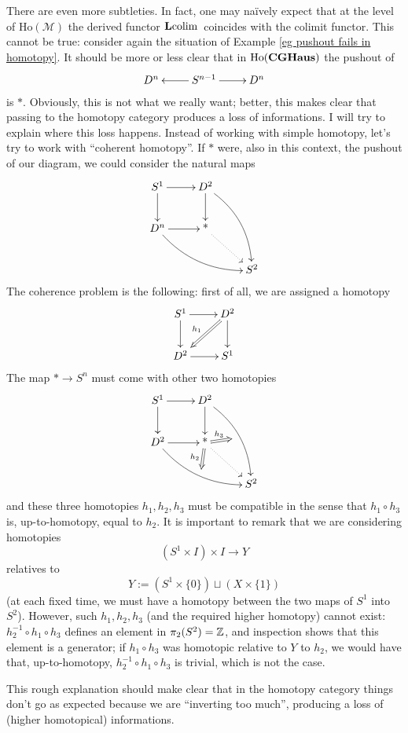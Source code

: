\begin{rmk}
There are even more subtleties. In fact, one may na\"ively expect that at the level of $\mathrm{Ho}(\mathcal M)$ the derived functor $\mathbf L \mathrm{colim} \,$ coincides with the colimit functor. This cannot be true: consider again the situation of Example \ref{eg pushout fails in homotopy}. It should be more or less clear that in $\mathrm{Ho}(\mathbf{CGHaus})$ the pushout of
\[
\xymatrix{
D^n & S^{n-1} \ar[l] \ar[r] & D^n
}
\]
is $*$. Obviously, this is not what we really want; better, this makes clear that passing to the homotopy category produces a loss of informations. I will try to explain where this loss happens. Instead of working with simple homotopy, let's try to work with ``coherent homotopy''. If $*$ were, also in this context, the pushout of our diagram, we could consider the natural maps
\[
\xymatrix{
S^1 \ar[d] \ar[r] & D^2 \ar@/^1pc/[ddr] \ar[d] \\ D^n \ar[r] \ar@/_1pc/[drr] & \text{*} \ar@{.>}[dr] \\ & & S^2
}
\]
The coherence problem is the following: first of all, we are assigned a homotopy
\[
\xymatrix{
S^1 \ar[d] \ar[r] & D^2 \ar[d] \ar@{=>}[dl]_{h_1} \\ D^2 \ar[r] & S^1
}
\]
The map $* \to S^n$ must come with other two homotopies
\[
\xymatrix{
S^1 \ar[d] \ar[r] & D^2 \ar@/^1pc/[ddr]_{\hspace{1pt}}="a" \ar[d] \\ D^2 \ar[r] \ar@/_1pc/[drr]^{\hspace{1pt}}="b" & \text{*} \ar@{.>}[dr] \ar@{=>}{};"a" ^{h_3} \ar@{=>}{};"b" _{h_2} \\ & & S^2
}
\]
and these three homotopies $h_1,h_2,h_3$ must be compatible in the sense that $h_1 \circ h_3$ is, up-to-homotopy, equal to $h_2$. It is important to remark that we are considering homotopies
\[
(S^1 \times I) \times I \to Y
\]
relatives to
\[
Y := (S^1 \times \{0\}) \sqcup (X \times \{1\})
\]
(at each fixed time, we must have a homotopy between the two maps of $S^1$ into $S^2$). However, such $h_1,h_2,h_3$ (and the required higher homotopy) cannot exist: $h_2^{-1} \circ h_1 \circ h_3$ defines an element in $\pi_2(S^2) = \mathbb{Z}$, and inspection shows that this element is a generator; if $h_1 \circ h_3$ was homotopic relative to $Y$ to $h_2$, we would have that, up-to-homotopy, $h_2^{-1} \circ h_1 \circ h_3$ is trivial, which is not the case.

This rough explanation should make clear that in the homotopy category things don't go as expected because we are ``inverting too much'', producing a loss of (higher homotopical) informations.
\end{rmk}

